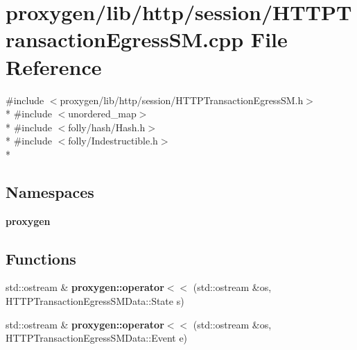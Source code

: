 \section{proxygen/lib/http/session/\+H\+T\+T\+P\+Transaction\+Egress\+SM.cpp File Reference}
\label{HTTPTransactionEgressSM_8cpp}
{\ttfamily \#include $<$proxygen/lib/http/session/\+H\+T\+T\+P\+Transaction\+Egress\+S\+M.\+h$>$}\\*
{\ttfamily \#include $<$unordered\+\_\+map$>$}\\*
{\ttfamily \#include $<$folly/hash/\+Hash.\+h$>$}\\*
{\ttfamily \#include $<$folly/\+Indestructible.\+h$>$}\\*
\subsection*{Namespaces}
\begin{DoxyCompactItemize}
\item 
 {\bf proxygen}
\end{DoxyCompactItemize}
\subsection*{Functions}
\begin{DoxyCompactItemize}
\item 
std\+::ostream \& {\bf proxygen\+::operator$<$$<$} (std\+::ostream \&os, H\+T\+T\+P\+Transaction\+Egress\+S\+M\+Data\+::\+State s)
\item 
std\+::ostream \& {\bf proxygen\+::operator$<$$<$} (std\+::ostream \&os, H\+T\+T\+P\+Transaction\+Egress\+S\+M\+Data\+::\+Event e)
\end{DoxyCompactItemize}
